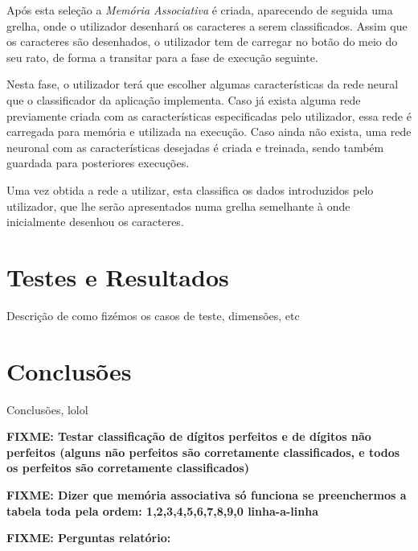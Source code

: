 \documentclass{article}
\begin{document}
Após esta seleção a \emph{Memória Associativa} é criada, aparecendo de seguida uma grelha, onde o utilizador desenhará os caracteres a serem classificados. Assim que os caracteres são desenhados, o utilizador tem de carregar no botão do meio do seu rato, de forma a transitar para a fase de execução seguinte.

Nesta fase, o utilizador terá que escolher algumas características da rede neural que o classificador da aplicação implementa. Caso já exista alguma rede previamente criada com as características especificadas pelo utilizador, essa rede é carregada para memória e utilizada na execução. Caso ainda não exista, uma rede neuronal com as características desejadas é criada e treinada, sendo também guardada para posteriores execuções. 

Uma vez obtida a rede a utilizar, esta classifica os dados introduzidos pelo utilizador, que lhe serão apresentados numa grelha semelhante à onde inicialmente desenhou os caracteres.


\pagebreak

\section{Testes e Resultados}

Descrição de como fizémos os casos de teste, dimensões, etc

\pagebreak

\section{Conclusões}

Conclusões, lolol

\pagebreak

\textbf{FIXME: Testar classificação de dígitos perfeitos e de dígitos não perfeitos (alguns não perfeitos são corretamente classificados, e todos os perfeitos são corretamente classificados)}

\textbf{FIXME: Dizer que memória associativa só funciona se preenchermos a tabela toda pela ordem: 1,2,3,4,5,6,7,8,9,0 linha-a-linha}

\vspace{.3cm}

\textbf{FIXME: Perguntas relatório:}
\end{document}
